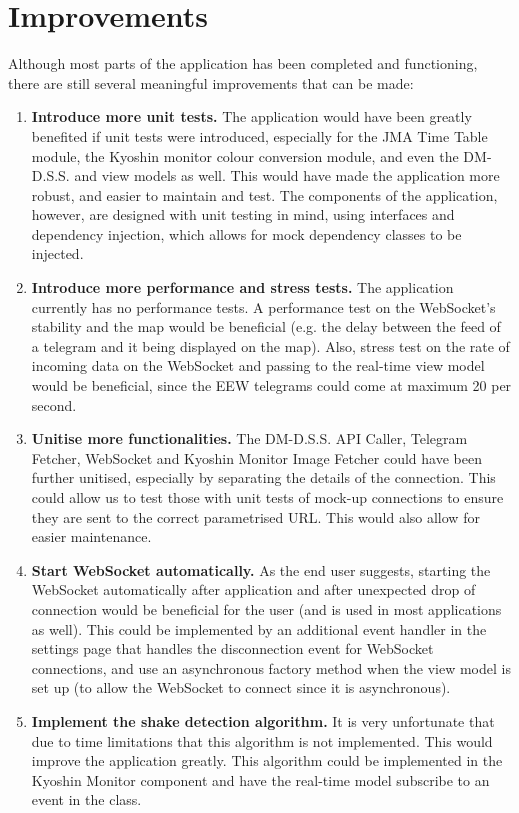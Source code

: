 \section{Improvements}

Although most parts of the application has been completed and functioning, there are still several meaningful improvements that can be made:
\begin{enumerate}
    \item \textbf{Introduce more unit tests.} The application would have been greatly benefited if unit tests were introduced, especially for the JMA Time Table module, the Kyoshin monitor colour conversion module, and even the DM-D.S.S. and view models as well. This would have made the application more robust, and easier to maintain and test. The components of the application, however, are designed with unit testing in mind, using interfaces and dependency injection, which allows for mock dependency classes to be injected.
    \item \textbf{Introduce more performance and stress tests.} The application currently has no performance tests. A performance test on the WebSocket's stability and the map would be beneficial (e.g. the delay between the feed of a telegram and it being displayed on the map). Also, stress test on the rate of incoming data on the WebSocket and passing to the real-time view model would be beneficial, since the EEW telegrams could come at maximum 20 per second.
    \item \textbf{Unitise more functionalities.} The DM-D.S.S. API Caller, Telegram Fetcher, WebSocket and Kyoshin Monitor Image Fetcher could have been further unitised, especially by separating the details of the connection. This could allow us to test those with unit tests of mock-up connections to ensure they are sent to the correct parametrised URL. This would also allow for easier maintenance.
    \item \textbf{Start WebSocket automatically.} As the end user suggests, starting the WebSocket automatically after application and after unexpected drop of connection would be beneficial for the user (and is used in most applications as well). This could be implemented by an additional event handler in the settings page that handles the disconnection event for WebSocket connections, and use an asynchronous factory method when the view model is set up (to allow the WebSocket to connect since it is asynchronous).
    \item \textbf{Implement the shake detection algorithm.} It is very unfortunate that due to time limitations that this algorithm is not implemented. This would improve the application greatly. This algorithm could be implemented in the Kyoshin Monitor component and have the real-time model subscribe to an event in the class.

\end{enumerate}
